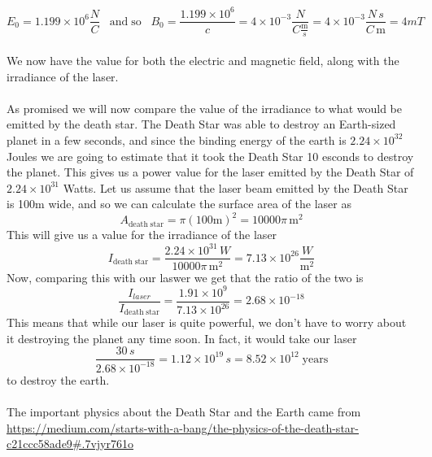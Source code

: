 \begin{equation*}
		E_0 = 1.199 \times 10^6 \dfrac{N}{C} \; \; \; \mathrm{and}\; \mathrm{so} \;\;\; B_0 = \dfrac{1.199 \times 10^6}{c} = 
		4\times 10^{-3} \dfrac{N}{C \frac{\mathrm{m}}{s}} = 
		4\times 10^{-3} \dfrac{N \,s}{C \,\mathrm{m}} = 
		4 mT
\end{equation*}
\\
We now have the value for both the electric and magnetic field, along with the irradiance of the laser. 
\\
\\
As promised we will now compare the value of the irradiance to what would be emitted by the death star. The Death Star was able to destroy an Earth-sized planet in a few seconds, and since the binding energy of the earth is $2.24\times 10^{32}$ Joules we are going to estimate that it took the Death Star 10 esconds to destroy the planet. This gives us a power value for the laser emitted by the Death Star of $2.24 \times 10^{31}$ Watts. Let us assume that the laser beam emitted by the Death Star is 100m wide, and so we can calculate the surface area of the laser as
$$A_{\mathrm{death}\;\mathrm{star}} = \pi (100\mathrm{m})^2 = 10000\pi\, \mathrm{m}^2$$
This will give us a value for the irradiance of the laser
$$I_{\mathrm{death}\;\mathrm{star}} = \frac{2.24 \times 10^{31} \,W}{10000\pi\, \mathrm{m}^2} = 7.13 \times 10^{26} \frac{W}{\mathrm{m}^2}$$
Now, comparing this with our laswer we get that the ratio of the two is
$$\frac{I_{laser}}{I_{\mathrm{death}\;\mathrm{star}}} = \frac{1.91 \times 10^9}{7.13 \times 10^{26}} = 2.68 \times 10^{-18}$$
This means that while our laser is quite powerful, we don't have to worry about it destroying the planet any time soon. In fact, it would take our laser 
$$\frac{30\,s}{2.68 \times 10^{-18}} = 1.12\times 10^{19}\,s = 8.52 \times 10^{12}\;\mathrm{years}$$
to destroy the earth.
\\
\\
The important physics about the Death Star and the Earth came from
\\
 \url{https://medium.com/starts-with-a-bang/the-physics-of-the-death-star-c21ccc58ade9#.7vjyr761o}